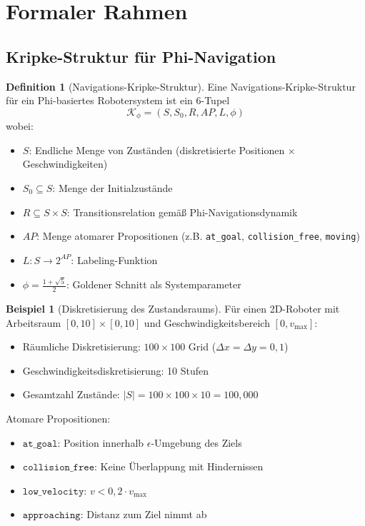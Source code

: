 ﻿\documentclass[a4paper,12pt]{article}
\theoremstyle{definition}
\newtheorem{definition}{Definition}[section]
\newtheorem{beispiel}{Beispiel}[section]
\begin{document}
\section{Formaler Rahmen}

\subsection{Kripke-Struktur für Phi-Navigation}

\begin{definition}[Navigations-Kripke-Struktur]
Eine Navigations-Kripke-Struktur für ein Phi-basiertes Robotersystem ist ein 6-Tupel
\[
\mathcal{K}_{\phi} = (S, S_0, R, AP, L, \phi)
\]
wobei:
\begin{itemize}
	\item $S$: Endliche Menge von Zuständen (diskretisierte Positionen $\times$ Geschwindigkeiten)
	\item $S_0 \subseteq S$: Menge der Initialzustände
	\item $R \subseteq S \times S$: Transitionsrelation gemäß Phi-Navigationsdynamik
	\item $AP$: Menge atomarer Propositionen (z.B. \texttt{at\_goal}, \texttt{collision\_free}, \texttt{moving})
	\item $L: S \to 2^{AP}$: Labeling-Funktion
	\item $\phi = \frac{1+\sqrt{5}}{2}$: Goldener Schnitt als Systemparameter
\end{itemize}
\end{definition}

\begin{beispiel}[Diskretisierung des Zustandsraums]
Für einen 2D-Roboter mit Arbeitsraum $[0,10] \times [0,10]$ und Geschwindigkeitsbereich $[0, v_{\max}]$:
\begin{itemize}
	\item Räumliche Diskretisierung: $100 \times 100$ Grid ($\Delta x = \Delta y = 0{,}1$)
	\item Geschwindigkeitsdiskretisierung: 10 Stufen
	\item Gesamtzahl Zustände: $|S| = 100 \times 100 \times 10 = 100{,}000$
\end{itemize}

Atomare Propositionen:
\begin{itemize}
	\item $\texttt{at\_goal}$: Position innerhalb $\epsilon$-Umgebung des Ziels
	\item $\texttt{collision\_free}$: Keine Überlappung mit Hindernissen
	\item $\texttt{low\_velocity}$: $v < 0{,}2 \cdot v_{\max}$
	\item $\texttt{approaching}$: Distanz zum Ziel nimmt ab
\end{itemize}
\end{beispiel}
\end{document}
